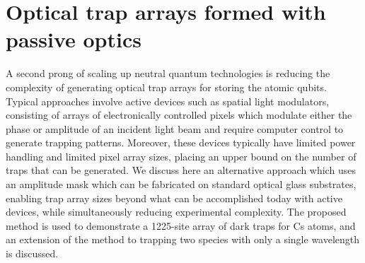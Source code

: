 \section{Optical trap arrays formed with passive optics}
A second prong of scaling up neutral quantum technologies is reducing the complexity of generating optical trap arrays for storing the atomic qubits. Typical approaches involve active devices such as spatial light modulators, consisting of arrays of electronically controlled pixels which modulate either the phase or amplitude of an incident light beam and require computer control to generate trapping patterns. Moreover, these devices typically have limited power handling and limited pixel array sizes, placing an upper bound on the number of traps that can be generated. We discuss here an alternative approach which uses an amplitude mask which can be fabricated on standard optical glass substrates, enabling trap array sizes beyond what can be accomplished today with active devices, while simultaneously reducing experimental complexity. The proposed method is used to demonstrate a 1225-site array of dark traps for Cs atoms, and an extension of the method to trapping two species with only a single wavelength is discussed.